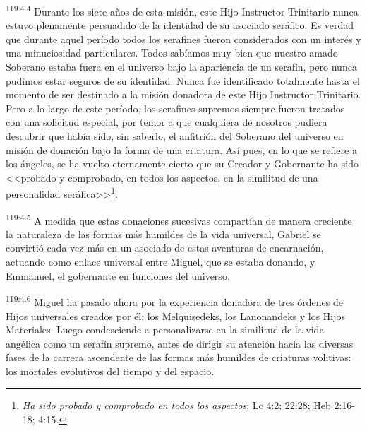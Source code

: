\par
\textsuperscript{119:4.4} Durante los siete años de esta misión, este Hijo Instructor Trinitario nunca estuvo plenamente persuadido de la identidad de su asociado seráfico. Es verdad que durante aquel período todos los serafines fueron considerados con un interés y una minuciosidad particulares. Todos sabíamos muy bien que nuestro amado Soberano estaba fuera en el universo bajo la apariencia de un serafín, pero nunca pudimos estar seguros de su identidad. Nunca fue identificado totalmente hasta el momento de ser destinado a la misión donadora de este Hijo Instructor Trinitario. Pero a lo largo de este período, los serafines supremos siempre fueron tratados con una solicitud especial, por temor a que cualquiera de nosotros pudiera descubrir que había sido, sin saberlo, el anfitrión del Soberano del universo en misión de donación bajo la forma de una criatura. Así pues, en lo que se refiere a los ángeles, se ha vuelto eternamente cierto que su Creador y Gobernante ha sido <<probado y comprobado, en todos los aspectos, en la similitud de una personalidad seráfica>>\footnote{\textit{Ha sido probado y comprobado en todos los aspectos}: Lc 4:2; 22:28; Heb 2:16-18; 4:15.}.

\par
\textsuperscript{119:4.5} A medida que estas donaciones sucesivas compartían de manera creciente la naturaleza de las formas más humildes de la vida universal, Gabriel se convirtió cada vez más en un asociado de estas aventuras de encarnación, actuando como enlace universal entre Miguel, que se estaba donando, y Emmanuel, el gobernante en funciones del universo.

\par
\textsuperscript{119:4.6} Miguel ha pasado ahora por la experiencia donadora de tres órdenes de Hijos universales creados por él: los Melquisedeks, los Lanonandeks y los Hijos Materiales. Luego condesciende a personalizarse en la similitud de la vida angélica como un serafín supremo, antes de dirigir su atención hacia las diversas fases de la carrera ascendente de las formas más humildes de criaturas volitivas: los mortales evolutivos del tiempo y del espacio.

